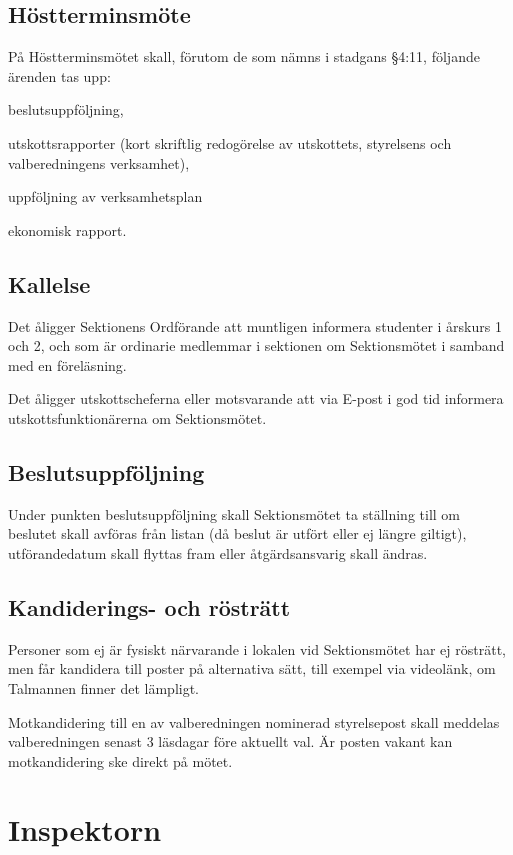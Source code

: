 \documentclass[10pt]{article}
\begin{document}
\subsection{Höstterminsmöte}
På Höstterminsmötet skall, förutom de som nämns i stadgans §4:11,
följande ärenden tas upp:
\begin{alphlist}
    \item beslutsuppföljning,
    \item utskottsrapporter (kort skriftlig redogörelse av utskottets, styrelsens och valberedningens verksamhet),
   	\item uppföljning av verksamhetsplan
    \item ekonomisk rapport.
\end{alphlist}

\subsection{Kallelse}
Det åligger Sektionens Ordförande att muntligen informera studenter i årskurs 1 och 2, och som är ordinarie medlemmar i sektionen om
Sektionsmötet i samband med en föreläsning.

Det åligger utskottscheferna eller motsvarande att via E-post i god tid
informera utskottsfunktionärerna om Sektionsmötet.

\subsection{Beslutsuppföljning}
Under punkten beslutsuppföljning skall Sektionsmötet ta ställning till om
beslutet skall avföras från listan (då beslut är utfört eller ej längre
giltigt), utförandedatum skall flyttas fram eller åtgärdsansvarig skall ändras.
\subsection{Kandiderings- och rösträtt}
Personer som ej är fysiskt närvarande i lokalen vid Sektionsmötet har ej rösträtt, men får kandidera till poster på alternativa sätt, till exempel via videolänk, om Talmannen finner det lämpligt.

Motkandidering till en av valberedningen nominerad styrelsepost skall meddelas valberedningen senast 3 läsdagar före aktuellt val. Är posten vakant kan motkandidering ske direkt på mötet.

\section{Inspektorn} %
\end{document}
